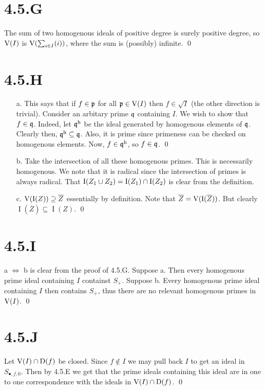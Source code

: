 \documentclass{article}
\begin{document}
\section{4.5.G}
The sum of two homogenous ideals of positive degree is surely positive degree,
so $\operatorname{V}(I)$ is $\operatorname{V}(\sum_{i \in I} (i))$, where the sum is
(possibly) infinite. \qed

\section{4.5.H}
\begin{itemize}
      \item[a.] This says that if $f \in \mathfrak{p}$ for all $\mathfrak{p} \in \operatorname{V}(I)$ then
            $f \in \sqrt{I}$ (the other direction is trivial). Consider an arbitary
            prime $\mathfrak{q}$ containing $I$. We wish to show
            that $f \in \mathfrak{q}$. Indeed, let $\mathfrak{q}^{\text{h}}$ be the ideal
            generated by homogenous elements of $\mathfrak{q}$. Clearly then,
            $\mathfrak{q}^{\text{h}} \subseteq \mathfrak{q}$. Also, it is prime since primeness can be checked on
            homogenous elements. Now, $f \in \mathfrak{q}^{\text{h}}$, so $f \in \mathfrak{q}$.
            \qed
      \item[b.] Take the intersection of all these homogenous primes. This is necessarily
            homogenous. We note that it is radical since the intersection of primes is
            always radical. That $\operatorname{I}(Z_1 \cup Z_2) = \operatorname{I}(Z_1) \cap
                  \operatorname{I}(Z_2)$ is clear from the definition.
      \item[c.] $\operatorname{V}(\operatorname{I}(Z)) \supseteq \overline{Z}$ essentially by definition. Note that
            $\overline{Z}=\operatorname{V}(\operatorname{I}(\overline{Z}))$. But clearly $\operatorname{I}(\overline{Z}) \subseteq \operatorname{I}(Z)$. \qed
\end{itemize}

\section{4.5.I}
a $\iff$ b is clear from the proof of 4.5.G. Suppose a. Then
every homogenous prime ideal containing $I$ containst
$S_+$. Suppose b. Every homogenous prime ideal containing
$I$ then contains $S_+$, thus there are
no relevant homogenous primes in $\operatorname{V}(I)$. \qed

\section{4.5.J}
Let $\operatorname{V}(I) \cap \operatorname{D}(f)$ be closed. Since $f \notin I$ we may
pull back $I$ to get an ideal in $S_{\bullet, f, 0}$.
Then by 4.5.E we get that the prime ideals containing this ideal are in one to
one correspondence with the ideals in $\operatorname{V}(I) \cap \operatorname{D}(f)$. \qed
\end{document}
